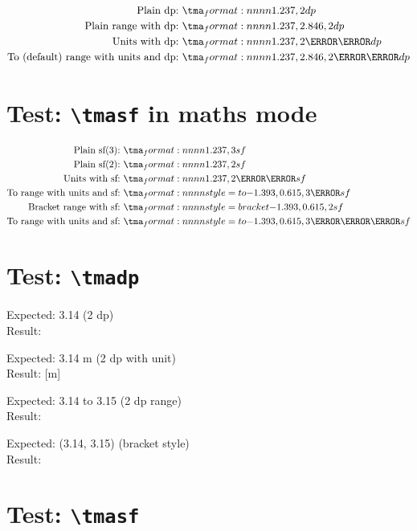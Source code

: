 \documentclass[a4paper,12pt]{article}
\begin{document}
\begin{align*}
    \text{Plain dp:} &~ \tmadp{1.237, 2}\\
    \text{Plain range with dp:} &~ \tmadp{1.237, 2.846, 2}\\
    \text{Units with dp:} &~ \tmadp{1.237, 2}[\centi\metre]\\
    \text{To (default) range with units and dp:} &~ \tmadp{1.237, 2.846, 2}[\kilo\gram]\\
\end{align*}

\section*{Test: \texttt{\textbackslash tmasf} in maths mode}

\begin{align*}
    \text{Plain sf(3):} &~ \tmasf{1.237, 3}\\
    \text{Plain sf(2):} &~ \tmasf{1.237,2}\\
    \text{Units with sf:} &~ \tmasf{1.237, 2}[\centi\metre]\\
    \text{To range with units and sf:} &~ \tmasf[style=to]{-1.393, 0.615, 3}[\gram]\\
    \text{Bracket range with sf:} &~ \tmasf[style=bracket]{-1.393, 0.615, 2}\\
    \text{To range with units and sf:} &~ \tmasf[style=to]{-1.393, 0.615, 3}[\metre\per\second]
\end{align*}


\section*{Test: \texttt{\textbackslash tmadp}}

Expected: 3.14 (2 dp) \\
Result: 

Expected: 3.14 m (2 dp with unit) \\
Result: [m]

Expected: 3.14 to 3.15 (2 dp range) \\
Result: 

Expected: (3.14, 3.15) (bracket style) \\
Result: 

\section*{Test: \texttt{\textbackslash tmasf}}
\end{document}
